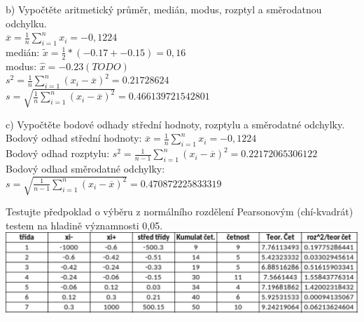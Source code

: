 \documentclass[11pt,a4paper]{article}
\begin{document}
\noindent\makebox[\linewidth]{\rule{\textwidth}{0.4pt}}

b) Vypočtěte aritmetický průměr, medián, modus, rozptyl a směrodatnou odchylku. \\

$ \overline{x} = \frac{1}{n} \sum\limits_{i=1}^n x_i = -0,1224$ \\

medián: $  \widetilde{x} = \frac{1}{2}*(-0.17 + -0.15) = 0,16 $ \\

modus: $ \widehat{x} = -0.23 (TODO) $ \\

$ s^2 = \frac{1}{n} \sum\limits_{i=1}^{n} (x_i - \overline{x})^2 = 0.21728624 $ \\

$ s = \sqrt{\frac{1}{n} \sum\limits_{i=1}^n (x_i - \overline{x})^2} = 0.466139721542801$ \\


\noindent\makebox[\linewidth]{\rule{\textwidth}{0.4pt}}

c) Vypočtěte bodové odhady střední hodnoty, rozptylu a směrodatné odchylky. \\

Bodový odhad střední hodnoty: $ \overline{x} = \frac{1}{n} \sum\limits_{i=1}^{n} x_i = -0,1224 $ \\

Bodový odhad rozptylu: $ s^2 = \frac{1}{n - 1} \sum\limits_{i=1}^{n} (x_i - \overline{x})^2 = 0.22172065306122 $ \\

Bodový odhad směrodatné odchylky: $ s = \sqrt{ \frac{1}{n - 1} \sum\limits_{i=1}^{n} (x_i - \overline{x})^2 } = 0.470872225833319 $ \\


\noindent\makebox[\linewidth]{\rule{\textwidth}{0.4pt}}

Testujte předpoklad o výběru z normálního rozdělení Pearsonovým (chí-kvadrát) testem na hladině významnosti 0,05. \\

\vspace{0.6cm}\includegraphics[width=\textwidth]{img/1dtable.pdf} \\
\end{document}
